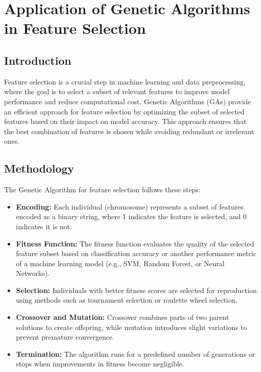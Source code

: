\section{Application of Genetic Algorithms in Feature Selection}

\subsection{Introduction}

Feature selection is a crucial step in machine learning and data preprocessing, where the goal is to select a subset of relevant features to improve model performance and reduce computational cost. Genetic Algorithms (GAs) provide an efficient approach for feature selection by optimizing the subset of selected features based on their impact on model accuracy. This approach ensures that the best combination of features is chosen while avoiding redundant or irrelevant ones.

\subsection{Methodology}

The Genetic Algorithm for feature selection follows these steps:

\begin{itemize}
    \item \textbf{Encoding:} Each individual (chromosome) represents a subset of features encoded as a binary string, where 1 indicates the feature is selected, and 0 indicates it is not.
    \item \textbf{Fitness Function:} The fitness function evaluates the quality of the selected feature subset based on classification accuracy or another performance metric of a machine learning model (e.g., SVM, Random Forest, or Neural Networks).
    \item \textbf{Selection:} Individuals with better fitness scores are selected for reproduction using methods such as tournament selection or roulette wheel selection.
    \item \textbf{Crossover and Mutation:} Crossover combines parts of two parent solutions to create offspring, while mutation introduces slight variations to prevent premature convergence.
    \item \textbf{Termination:} The algorithm runs for a predefined number of generations or stops when improvements in fitness become negligible.
\end{itemize}

